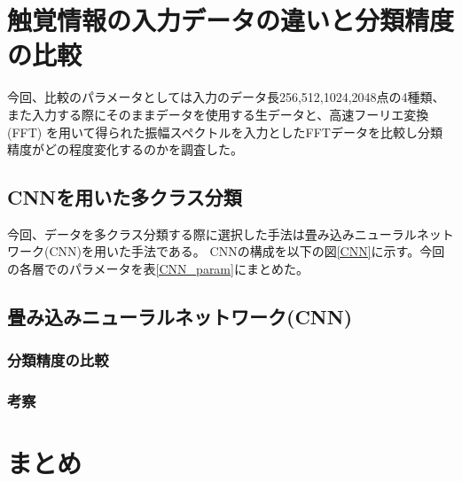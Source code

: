 		
\section{触覚情報の入力データの違いと分類精度の比較}
		今回、比較のパラメータとしては入力のデータ長256,512,1024,2048点の4種類、また入力する際にそのままデータを使用する生データと、高速フーリエ変換(FFT)
		を用いて得られた振幅スペクトルを入力としたFFTデータを比較し分類精度がどの程度変化するのかを調査した。
	\subsection{CNNを用いた多クラス分類}
		今回、データを多クラス分類する際に選択した手法は畳み込みニューラルネットワーク(CNN)を用いた手法である。
		CNNの構成を以下の図\ref{CNN}に示す。今回の各層でのパラメータを表\ref{CNN_param}にまとめた。


		\subsection{畳み込みニューラルネットワーク(CNN)}

		\subsubsection{分類精度の比較}
		\subsubsection{考察}
	\subsection{}
	\subsection{}

\section{まとめ}

